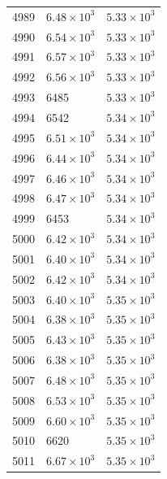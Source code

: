\begin{table}[H]
\begin{tabular}{lll}
4989 & $\displaystyle 6.48 \times 10^{3}$ & $\displaystyle 5.33 \times 10^{3}$ \\
4990 & $\displaystyle 6.54 \times 10^{3}$ & $\displaystyle 5.33 \times 10^{3}$ \\
4991 & $\displaystyle 6.57 \times 10^{3}$ & $\displaystyle 5.33 \times 10^{3}$ \\
4992 & $\displaystyle 6.56 \times 10^{3}$ & $\displaystyle 5.33 \times 10^{3}$ \\
4993 & 6485 & $\displaystyle 5.33 \times 10^{3}$ \\
4994 & 6542 & $\displaystyle 5.34 \times 10^{3}$ \\
4995 & $\displaystyle 6.51 \times 10^{3}$ & $\displaystyle 5.34 \times 10^{3}$ \\
4996 & $\displaystyle 6.44 \times 10^{3}$ & $\displaystyle 5.34 \times 10^{3}$ \\
4997 & $\displaystyle 6.46 \times 10^{3}$ & $\displaystyle 5.34 \times 10^{3}$ \\
4998 & $\displaystyle 6.47 \times 10^{3}$ & $\displaystyle 5.34 \times 10^{3}$ \\
4999 & 6453 & $\displaystyle 5.34 \times 10^{3}$ \\
5000 & $\displaystyle 6.42 \times 10^{3}$ & $\displaystyle 5.34 \times 10^{3}$ \\
5001 & $\displaystyle 6.40 \times 10^{3}$ & $\displaystyle 5.34 \times 10^{3}$ \\
5002 & $\displaystyle 6.42 \times 10^{3}$ & $\displaystyle 5.34 \times 10^{3}$ \\
5003 & $\displaystyle 6.40 \times 10^{3}$ & $\displaystyle 5.35 \times 10^{3}$ \\
5004 & $\displaystyle 6.38 \times 10^{3}$ & $\displaystyle 5.35 \times 10^{3}$ \\
5005 & $\displaystyle 6.43 \times 10^{3}$ & $\displaystyle 5.35 \times 10^{3}$ \\
5006 & $\displaystyle 6.38 \times 10^{3}$ & $\displaystyle 5.35 \times 10^{3}$ \\
5007 & $\displaystyle 6.48 \times 10^{3}$ & $\displaystyle 5.35 \times 10^{3}$ \\
5008 & $\displaystyle 6.53 \times 10^{3}$ & $\displaystyle 5.35 \times 10^{3}$ \\
5009 & $\displaystyle 6.60 \times 10^{3}$ & $\displaystyle 5.35 \times 10^{3}$ \\
5010 & 6620 & $\displaystyle 5.35 \times 10^{3}$ \\
5011 & $\displaystyle 6.67 \times 10^{3}$ & $\displaystyle 5.35 \times 10^{3}$ \\

\end{tabular}
\end{table}

